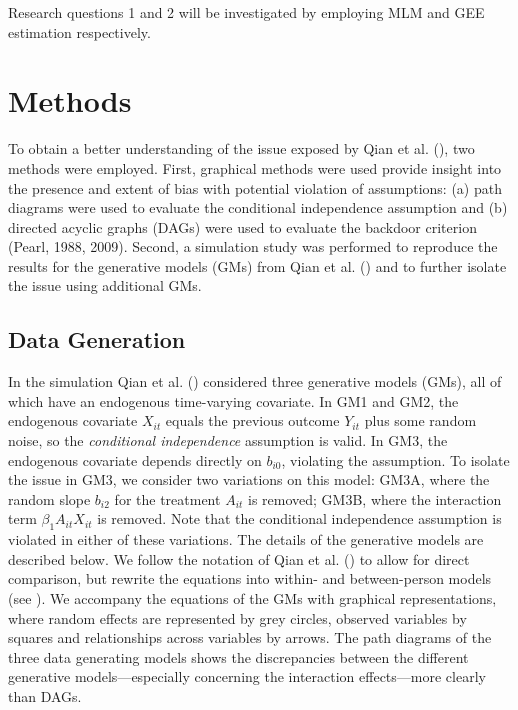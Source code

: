 \documentclass[
  12pt,
  a4paper,
]{article}
\begin{document}
Research questions 1 and 2 will be investigated by employing MLM and GEE
estimation respectively.

\newpage

\section{Methods}\label{methods}

To obtain a better understanding of the issue exposed by Qian et al.
(), two methods were employed. First,
graphical methods were used provide insight into the presence and extent
of bias with potential violation of assumptions: (a) path diagrams were
used to evaluate the conditional independence assumption and (b)
directed acyclic graphs (DAGs) were used to evaluate the backdoor
criterion (Pearl, 1988, 2009). Second, a simulation study was performed
to reproduce the results for the generative models (GMs) from Qian et
al. () and to further isolate the issue
using additional GMs.

\subsection{Data Generation}\label{data-generation}

In the simulation Qian et al. () considered
three generative models (GMs), all of which have an endogenous
time-varying covariate. In GM1 and GM2, the endogenous covariate
\(X_{it}\) equals the previous outcome \(Y_{it}\) plus some random
noise, so the \emph{conditional independence} assumption is valid. In
GM3, the endogenous covariate depends directly on \(b_{i0}\), violating
the assumption. To isolate the issue in GM3, we consider two variations
on this model: GM3A, where the random slope \(b_{i2}\) for the treatment
\(A_{it}\) is removed; GM3B, where the interaction term
\(\beta_1 A_{it} X_{it}\) is removed. Note that the conditional
independence assumption is violated in either of these variations. The
details of the generative models are described below. We follow the
notation of Qian et al. () to allow for
direct comparison, but rewrite the equations into within- and
between-person models (see ). We accompany the equations of the GMs with graphical
representations, where random effects are represented by grey circles,
observed variables by squares and relationships across variables by
arrows. The path diagrams of the three data generating models shows the
discrepancies between the different generative models---especially
concerning the interaction effects---more clearly than DAGs.
\end{document}
